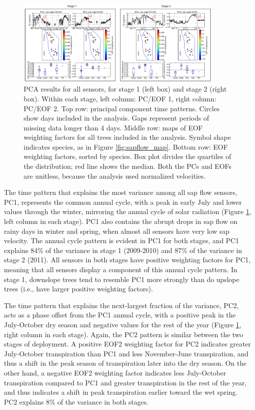 \begin{figure}[here]
\includegraphics[width=0.9\textwidth]{ch1-sapflow/figures/Figure05.pdf}
\caption{PCA results for all sensors, for stage 1 (left box) and stage 2 (right box).  Within each stage, left column: PC/EOF 1, right column: PC/EOF 2.  Top row: principal component time patterns.  Circles show days included in the analysis.  Gaps represent periods of missing data longer than 4 days.  Middle row: maps of EOF weighting factors for all trees included in the analysis.  Symbol shape indicates species, as in Figure \ref{fig:sapflow_map}.  Bottom row: EOF weighting factors, sorted by species.  Box plot divides the quartiles of the distribution; red line shows the median.  Both the PCs and EOFs are unitless, because the analysis used normalized velocities.}
\label{fig:sapflow_eof}
\end{figure}

The time pattern that explains the most variance among all sap flow sensors, PC1, represents the common annual cycle, with a peak in early July and lower values through the winter, mirroring the annual cycle of solar radiation (Figure \ref{fig:sapflow_eof}, left column in each stage).  PC1 also contains the abrupt drops in sap flow on rainy days in winter and spring, when almost all sensors have very low sap velocity.  The annual cycle pattern is evident in PC1 for both stages, and PC1 explains 84\% of the variance in stage 1 (2009-2010) and 87\% of the variance in stage 2 (2011).  All sensors in both stages have positive weighting factors for PC1, meaning that all sensors display a component of this annual cycle pattern.  In stage 1, downslope trees tend to resemble PC1 more strongly than do upslope trees (i.e., have larger positive weighting factors).

The time pattern that explains the next-largest fraction of the variance, PC2, acts as a phase offset from the PC1 annual cycle, with a positive peak in the July-October dry season and negative values for the rest of the year (Figure \ref{fig:sapflow_eof}, right column in each stage).  Again, the PC2 pattern is similar between the two stages of deployment.  A positive EOF2 weighting factor for PC2 indicates greater July-October transpiration than PC1 and less November-June transpiration, and thus a shift in the peak season of transpiration later into the dry season.  On the other hand, a negative EOF2 weighting factor indicates less July-October transpiration compared to PC1 and greater transpiration in the rest of the year, and thus indicates a shift in peak transpiration earlier toward the wet spring.  PC2 explains 8\% of the variance in both stages.

